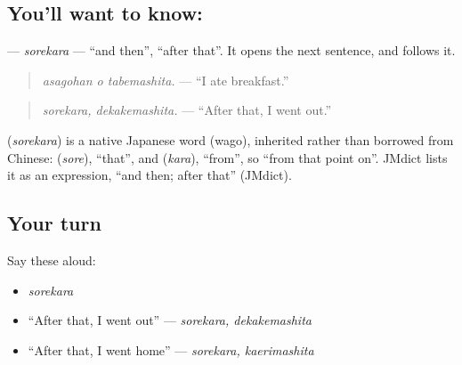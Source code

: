 \subsection*{You'll want to know: }
\textbf{} — \emph{sorekara} — \textquotedblleft{}and then\textquotedblright{}, \textquotedblleft{}after that\textquotedblright{}. It opens the next sentence, and \textbf{} follows it.

\begin{quote}
\textbf{ }
\end{quote}

\begin{quote}
\emph{asagohan o tabemashita.} — \textquotedblleft{}I ate breakfast.\textquotedblright{}
\end{quote}

\begin{quote}
\textbf{}
\end{quote}

\begin{quote}
\emph{sorekara, dekakemashita.} — \textquotedblleft{}After that, I went out.\textquotedblright{}
\end{quote}

\begin{cousinweb}
\textbf{} (\emph{sorekara}) is a native Japanese word (wago), inherited rather than borrowed from Chinese: \textbf{} (\emph{sore}), \textquotedblleft{}that\textquotedblright{}, and \textbf{} (\emph{kara}), \textquotedblleft{}from\textquotedblright{}, so \textquotedblleft{}from that point on\textquotedblright{}. JMdict lists it as an expression, \textquotedblleft{}and then; after that\textquotedblright{} (JMdict).
\end{cousinweb}

\subsection*{Your turn}
Say these aloud:

\begin{itemize}
\raggedright
  \item \emph{sorekara}
  \item \textquotedblleft{}After that, I went out\textquotedblright{} — \emph{sorekara, dekakemashita}
  \item \textquotedblleft{}After that, I went home\textquotedblright{} — \emph{sorekara, kaerimashita}
\end{itemize}


